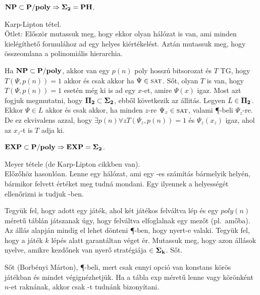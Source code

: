 \begin{Exercise}[counter={sorszam}, difficulty=1]
	$\mbox{\ensuremath{\mathbf{NP}}} \subset \mbox{\ensuremath{\mathbf{P/poly}}} \Rightarrow \mbox{\ensuremath{\mathbf{\Sigma_2}}}=\mbox{\ensuremath{\mathbf{PH}}}$.
\end{Exercise}	
\begin{Answer}
	Karp-Lipton t\'etel.\\
	\"Otlet: El\H oször mutassuk meg, hogy ekkor olyan hálózat is van, ami minden kielégíthet\H o \SAT formulához ad egy helyes kiértékelést. Aztán mutassuk meg, hogy \"osszeomlana a polinomi\'alis hierarchia.
	
	Ha $\mbox{\ensuremath{\mathbf{NP}}} \subset \mbox{\ensuremath{\mathbf{P/poly}}}$, akkor van egy $p(n)$ poly hossz\'u bitsorozat \'es $T$ TG, hogy $T(\Psi,p(n))=1$ akkor \'es csak akkor ha $\Psi\in\mbox{\sc{sat}}$. S\H ot, olyan $T$ is van, hogy $T(\Psi,p(n))=1$ eset\'en m\'eg ki is ad egy $x$-et, amire $\Psi(x)$ igaz. Most azt fogjuk megmutatni, hogy $\mbox{\ensuremath{\mathbf{\Pi_2}}}\subset\mbox{\ensuremath{\mathbf{\Sigma_2}}}$, ebb\H ol k\"ovetkezik az \'allit\'as. Legyen $L\in \mbox{\ensuremath{\mathbf{\Pi_2}}}$. Ekkor $\Psi\in L$ akkor \'es csak akkor, ha minden $z$-re $\Psi_z\in \mbox{\sc{sat}}$, valami \P-beli $\Psi_z$-re. De ez ekvivalens azzal, hogy $\exists p(n) \forall z T(\Psi_z,p(n))=1$ \'es $\Psi_z(x_z)$ igaz, ahol az $x_z$-t is $T$ adja ki.
\end{Answer}

\begin{Exercise}[counter={sorszam}, difficulty=1]
	$\mbox{\ensuremath{\mathbf{EXP}}}\subset \mbox{\ensuremath{\mathbf{P/poly}}} \Rightarrow \mbox{\ensuremath{\mathbf{EXP}}}= \mbox{\ensuremath{\mathbf{\Sigma_2}}}$.
\end{Exercise}	
\begin{Answer}
	Meyer t\'etele (de Karp-Lipton cikkben van).\\
	El\H oz\H oh\"oz hasonl\'oan. Lenne egy hálózat, ami egy \EXP-es sz\'am\'it\'as b\'armelyik hely\'en, b\'armikor felvett \'ert\'eket meg tudn\'a mondani. Egy ilyennek a helyess\'eg\'et ellen\H orizni is tudjuk \coNP-ben.
\end{Answer}

\begin{Exercise}[counter={sorszam}, difficulty=0]
	Tegyük fel, hogy adott egy játék, ahol két játékos felváltva lép és egy $poly(n)$ méret\H u táblán játszanak \'ugy, hogy felv\'altva elfoglalnak egy mez\H ot (pl.\ am\H oba). Az állás alapján mindig el lehet dönteni \P-ben, hogy nyert-e valaki. Tegy\"uk fel, hogy a játék $k$ lépés alatt garant\'altan véget ér. Mutassuk meg, hogy azon \'all\'asok nyelve, amikre kezd\H onek van nyer\H o stratégiája $\in \mbox{\ensuremath{\mathbf{\Sigma_k}}}$. S\H ot.
\end{Exercise}	
\begin{Answer}
	S\H ot (Borb\'enyi M\'arton), \P-beli, mert csak ennyi opci\'o van konstans k\"or\"os j\'at\'ekban \'es mindet v\'egign\'ezhetj\"uk.
	Ha a t\'abla exp m\'eret\H u lenne vagy k\"or\"onk\'ent $n$-et rakn\'anak, akkor csak \Sigmak-t tudn\'ank bizony\'itani.	
\end{Answer}

